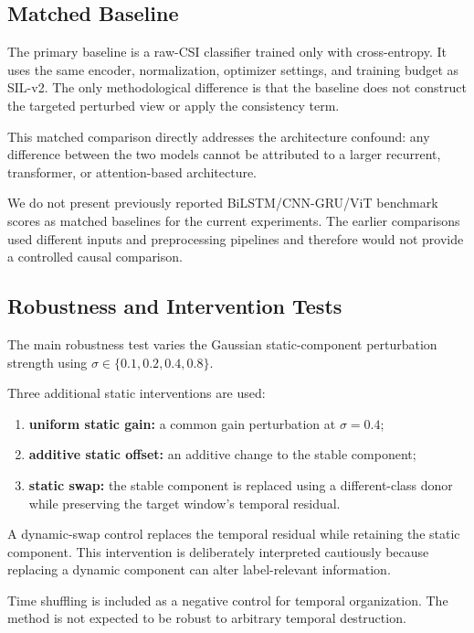\documentclass[runningheads]{llncs}
\newcommand{\method}{SIL-v2}
\begin{document}
\subsection{Matched Baseline}

The primary baseline is a raw-CSI classifier trained only with cross-entropy. It uses the same encoder, normalization, optimizer settings, and training budget as \method{}. The only methodological difference is that the baseline does not construct the targeted perturbed view or apply the consistency term.

This matched comparison directly addresses the architecture confound: any difference between the two models cannot be attributed to a larger recurrent, transformer, or attention-based architecture.

We do not present previously reported BiLSTM/CNN-GRU/ViT benchmark scores as matched baselines for the current experiments. The earlier comparisons used different inputs and preprocessing pipelines and therefore would not provide a controlled causal comparison.

\subsection{Robustness and Intervention Tests}

The main robustness test varies the Gaussian static-component perturbation strength using $\sigma\in\{0.1,0.2,0.4,0.8\}$.

Three additional static interventions are used:
\begin{enumerate}[leftmargin=*]
    \item \textbf{uniform static gain:} a common gain perturbation at $\sigma=0.4$;
    \item \textbf{additive static offset:} an additive change to the stable component;
    \item \textbf{static swap:} the stable component is replaced using a different-class donor while preserving the target window's temporal residual.
\end{enumerate}

A dynamic-swap control replaces the temporal residual while retaining the static component. This intervention is deliberately interpreted cautiously because replacing a dynamic component can alter label-relevant information.

Time shuffling is included as a negative control for temporal organization. The method is not expected to be robust to arbitrary temporal destruction.
\end{document}
